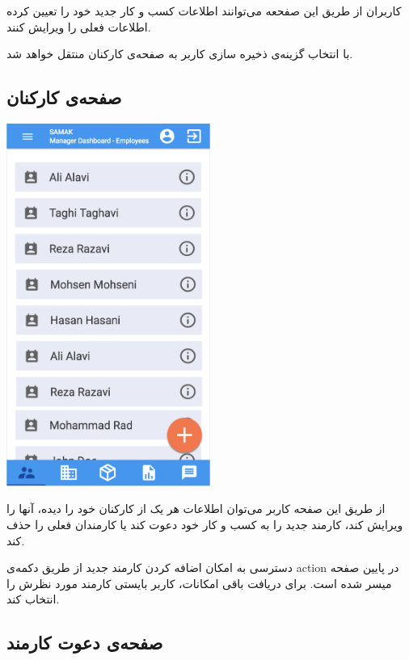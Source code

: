 کاربران از طریق این صفحعه می‌توانند اطلاعات کسب و کار جدید خود را تعیین کرده اطلاعات فعلی را ویرایش کنند.

با انتخاب گزینه‌ی ذخیره سازی کاربر به صفحه‌ی کارکنان منتقل خواهد شد.


\subsection{صفحه‌ی کارکنان}

\begin{center}
\includegraphics[width = 0.5\textwidth]{images/9-employees.png}
\end{center}

از طریق این صفحه کاربر می‌توان اطلاعات هر یک از کارکنان خود را دیده، آنها را ویرایش کند، کارمند جدید را به کسب و کار خود دعوت کند یا کارمندان فعلی را حذف کند.

دسترسی به امکان اضافه کردن کارمند جدید از طریق دکمه‌ی action در پایین صفحه میسر شده است. برای دریافت باقی امکانات، کاربر بایستی کارمند مورد نظرش را انتخاب کند.


\subsection{صفحه‌ی دعوت کارمند}

